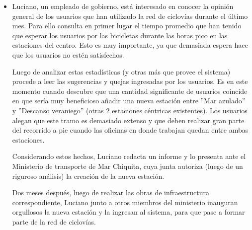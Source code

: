 \begin{itemize}
\item Luciano, un empleado de gobierno, está interesado en conocer la opinión general de los usuarios que han utilizado la
red de ciclovías durante el último mes. Para ello consulta en primer lugar el tiempo promedio que han tenido que esperar   
los usuarios por las bicicletas durante las horas pico en las estaciones del centro. Esto es muy importante, ya que 
demasiada espera hace que los usuarios no estén satisfechos.

Luego de analizar estas estadísticas (y otras más que provee el sistema) procede a leer las sugerencias y quejas ingresadas
por los usuarios. Es en este momento cuando descubre que una cantidad significante de usuarios coincide en que sería muy
beneficioso añadir una nueva estación entre ''Mar azulado'' y ''Descanso veraniego'' (otras 2 estaciones céntricas 
existentes). Los usuarios alegan que este tramo es demasiado extenso y que deben realizar gran parte del recorrido a pie
cuando las oficinas en donde trabajan quedan entre ambas estaciones.

Considerando estos hechos, Luciano redacta un informe y lo presenta ante el Ministerio de transporte de Mar Chiquita, cuya
junta autoriza (luego de un riguroso análisis) la creación de la nueva estación.

Dos meses después, luego de realizar las obras de infraestructura correspondiente, Luciano junto a otros miembros del
ministerio inauguran orgullosos la nueva estación y la ingresan al sistema, para que pase a formar parte de la red de ciclovías.

\end{itemize}